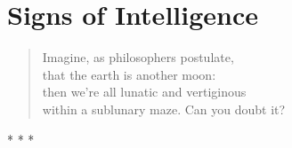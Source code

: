 \section{Signs of Intelligence}

\begin{quotex}
\begin{verse}
Imagine, as philosophers postulate,\\
that the earth is another moon:\\
then we're all lunatic and vertiginous\\
within a sublunary maze. Can you doubt it?
\end{verse}
\end{quotex}


\begin{center}* * *\end{center}

